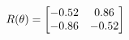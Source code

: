 \documentclass[preview]{standalone}
\begin{document}
\begin{align*}
\special{dvisvgm:raw <g id='unique000'>}R(\theta) = \begin{bmatrix}-0.52 & 0.86\\-0.86 & -0.52\end{bmatrix}\special{dvisvgm:raw </g>}
\end{align*}
\end{document}
